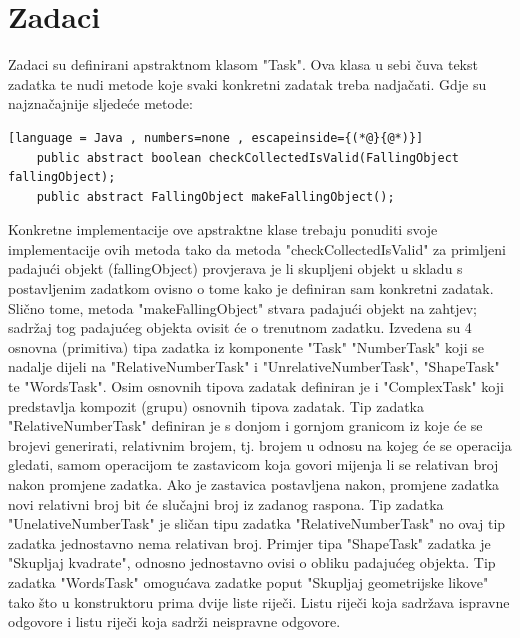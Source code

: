 \documentclass[times, utf8, zavrsni, numeric]{fer}
\begin{document}
	\section{Zadaci}
	Zadaci su definirani apstraktnom klasom "Task". Ova klasa u sebi čuva tekst zadatka te nudi metode koje svaki konkretni zadatak treba nadjačati. Gdje su najznačajnije  sljedeće metode:
	\begin{lstlisting}[language = Java , numbers=none , escapeinside={(*@}{@*)}]
	public abstract boolean checkCollectedIsValid(FallingObject fallingObject);
	public abstract FallingObject makeFallingObject();
	\end{lstlisting}
	Konkretne implementacije ove apstraktne klase trebaju ponuditi svoje implementacije
	 ovih metoda tako da metoda "checkCollectedIsValid" za primljeni padajući objekt (fallingObject) provjerava je li skupljeni objekt u skladu s postavljenim zadatkom ovisno o tome kako je definiran sam konkretni
	 zadatak. Slično tome, metoda "makeFallingObject" stvara padajući objekt na zahtjev;  sadržaj tog padajućeg objekta ovisit će o trenutnom zadatku. Izvedena su 4 osnovna (primitiva) tipa zadatka iz komponente "Task"
	 "NumberTask" koji se nadalje dijeli na "RelativeNumberTask" i "UnrelativeNumberTask", "ShapeTask" te "WordsTask". Osim osnovnih tipova zadatak definiran je i "ComplexTask"  koji predstavlja kompozit (grupu)
	 osnovnih tipova zadatak.
	 Tip zadatka "RelativeNumberTask" definiran je s donjom i gornjom granicom iz koje će se brojevi generirati, relativnim brojem, tj. brojem u odnosu na kojeg će se operacija gledati, samom operacijom te
	 zastavicom koja govori mijenja li se relativan broj nakon promjene zadatka. Ako je zastavica postavljena nakon, promjene zadatka novi relativni broj bit će slučajni broj iz zadanog raspona. Tip zadatka
	 "UnelativeNumberTask" je sličan tipu zadatka "RelativeNumberTask" no ovaj tip zadatka jednostavno nema relativan broj. Primjer tipa "ShapeTask" zadatka je "Skupljaj kvadrate", odnosno jednostavno ovisi
	 o obliku padajućeg objekta. Tip zadatka "WordsTask" omogućava zadatke poput "Skupljaj geometrijske likove" tako što u konstruktoru prima dvije liste riječi. Listu riječi koja sadržava ispravne odgovore i listu riječi
	 koja sadrži neispravne odgovore. 
	 
\end{document}

